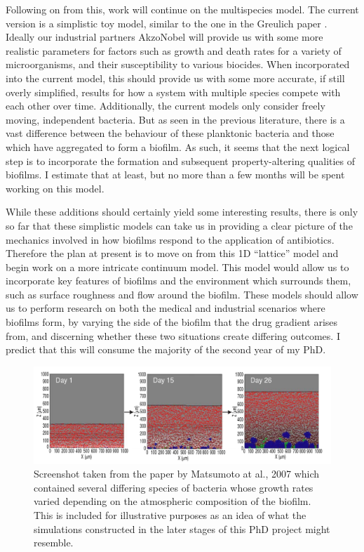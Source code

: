 \documentclass[a4paper,12pt]{article}
\begin{document}
Following on from this, work will continue on the multispecies model.  The current version is a simplistic toy model, similar to the one in the 
Greulich paper \cite{bioref:Greulich-growthDependentAntibiotics}.  Ideally our industrial partners AkzoNobel will provide us with some more realistic parameters for factors such as 
growth and death rates for a variety of microorganisms, and their susceptibility to various biocides.  When incorporated into the current model, this should provide us with some more 
accurate, if still overly simplified, results for how a system with multiple species compete with each other over time.  Additionally, the current models only consider freely 
moving, independent bacteria.  But as seen in the previous literature, there is a vast difference between the behaviour of these  planktonic bacteria and those which have 
aggregated to form a biofilm.  As such, it seems that the next logical step is to incorporate the formation and subsequent property-altering qualities of biofilms.  I estimate 
that at least, but no more than a few months will be spent working on this model.

While these additions should certainly yield some interesting results, there is only so far that these simplistic models can take us in providing a clear picture of the mechanics 
involved in how biofilms respond to the application of antibiotics.  Therefore the plan at present is to move on from this 1D ``lattice'' model and begin work on a more 
intricate continuum model.  This model would allow us to incorporate key features of biofilms and the environment which surrounds them, such as surface roughness and flow around 
the biofilm.  These models should allow us to perform research on both the medical and industrial scenarios where biofilms form, by varying the side of the biofilm that the 
drug gradient arises from, and discerning whether these two situations create differing outcomes.  I predict that this will consume the majority of the second year of my PhD.



\begin{figure}[H]
 \centering
 \includegraphics[width=16.4cm]{Matsumoto-biofilm-simulation}
 \caption{Screenshot taken from the paper by Matsumoto at al., 2007 \cite{bioref:Matsumoto-sim-snapshot-2007} which contained several differing species of bacteria whose growth rates 
 varied depending on the atmospheric composition of the biofilm.  This is included for illustrative purposes as an idea of what the simulations constructed in the later 
 stages of this PhD project might resemble.}
 \label{fig:Greulich-time-til-resistance}
\end{figure}
\end{document}
